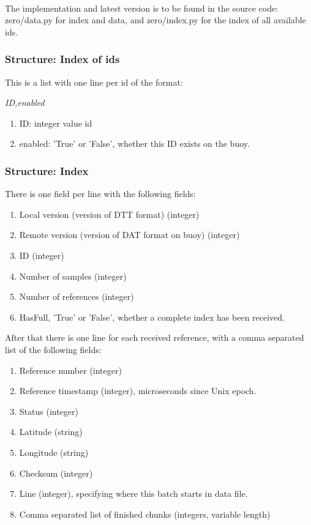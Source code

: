 \documentclass[a4paper]{article}
\begin{document}
\begin{multicols}{2}
  \paragraph{}The implementation and latest version is to be found in
  the source code: zero/data.py for index and data, and zero/index.py
  for the index of all available ids.

  \subsubsection{Structure: Index of ids}
  This is a list with one line per id of the format: \\
  \begin{center}
  \textit{ID,enabled}
  \end{center}

  \begin{enumerate}
    \item ID: integer value id
    \item enabled: 'True' or 'False', whether this ID exists on the
      buoy.
  \end{enumerate}

  \subsubsection{Structure: Index}
  There is one field per line with the following fields: \\
  \begin{enumerate}
    \item Local version (version of DTT format) (integer)
    \item Remote version (version of DAT format on buoy) (integer)
    \item ID (integer)
    \item Number of samples (integer)
    \item Number of references (integer)
    \item HasFull, 'True' or 'False', whether a complete index has been
      received.
  \end{enumerate}

  After that there is one line for each received reference, with a comma
  separated list of the following fields: \\
  \begin{enumerate}
    \item Reference number (integer)
    \item Reference timestamp (integer), microseconds since Unix epoch.
    \item Status (integer)
    \item Latitude  (string)
    \item Longitude (string)
    \item Checksum (integer)
    \item Line (integer), specifying where this batch starts in data file.
    \item Comma separated list of finished chunks (integers, variable
      length)
  \end{enumerate}


\end{multicols}
\end{document}
